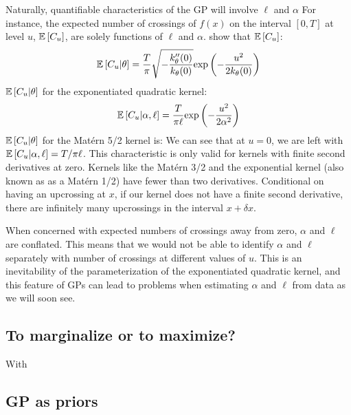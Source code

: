 \documentclass{article}
\newcommand{\Exp}[1]{\ensuremath{\mathbb{E} \lb #1 \rb}}
\newcommand{\lb}{\ensuremath{\left[}}
\newcommand{\rb}{\ensuremath{\right]}}
\begin{document}
Naturally, quantifiable characteristics of the GP will involve $\ell$ and $\alpha$ 
For instance, the expected number of crossings of $f(x)$ on the interval $[0,
T]$ at level $u$, $\Exp{C_u}$, are solely functions of $\ell$ and $\alpha$. 
\citet{cramer2004stationary} show that $\Exp{C_u}$:
\begin{align*} 
  \Exp{C_u | \theta} = \dfrac{T}{\pi} 
\sqrt{-\dfrac{k_\theta^{\prime \prime}(0)}{k_\theta(0)}}
  \text{exp}\left(-\dfrac{u^2}{2k_\theta(0)}\right)
\end{align*} 
$\Exp{C_u | \theta}$ for the exponentiated quadratic kernel:
\begin{align*} 
  \Exp{C_u | \alpha, \ell} = \dfrac{T}{\pi \ell}\text{exp}\left(-\dfrac{u^2}{2 \alpha ^ 2} \right)
\end{align*} 
$\Exp{C_u | \theta}$ for the Mat\'{e}rn 5/2 kernel is:
We can see that at $u = 0$, we are left with $\Exp{C_u | \alpha, \ell} = T /
\pi \ell$.  This characteristic is only valid for kernels with finite second
derivatives at zero. Kernels like the Mat\'{e}rn 3/2 and the exponential kernel
(also known as as a Mat\'{e}rn 1/2) have fewer than two derivatives.
Conditional on having an upcrossing at $x$, if our kernel does not have a
finite second derivative, there are infinitely many upcrossings in the interval
$x + \delta x$.

When concerned with expected numbers of crossings away from zero, $\alpha$ and
$\ell$ are conflated.  This means that we would not be able to identify
$\alpha$ and $\ell$ separately with number of crossings at different values of
$u$.  This is an inevitability of the parameterization of the exponentiated
quadratic kernel, and this feature of GPs can lead to problems when estimating
$\alpha$ and $\ell$ from data as we will soon see.

\subsection{To marginalize or to maximize?}

With 

\subsection{GP as priors}
\end{document}
